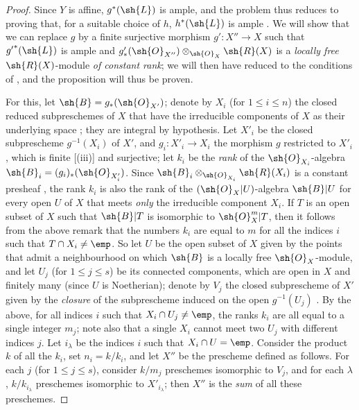 \begin{proof}
Since $Y$ is affine, $g^*(\sh{L})$ is ample, and the problem thus reduces to proving that, for a suitable choice of $h$, $h^*(\sh{L})$ is ample .
We will show that we can replace $g$ by a finite surjective morphism $g':X''\to X$ such that ${g'}^*(\sh{L})$ is ample and $g'_*(\sh{O}_{X''})\otimes_{\sh{O}_X}\sh{R}(X)$ is a \emph{locally free} $\sh{R}(X)$-module \emph{of constant rank};
we will then have reduced to the conditions of , and the proposition will thus be proven.

For this, let $\sh{B}=g_*(\sh{O}_{X'})$;
denote by $X_i$ (for $1\leq i\leq n$) the closed reduced subpreschemes of $X$ that have the irreducible components of $X$ as their underlying space ;
they are integral by hypothesis.
Let $X'_i$ be the closed subprescheme $g^{-1}(X_i)$ of $X'$, and $g_i:X'_i\to X_i$ the morphism $g$ restricted to $X'_i$, which is finite [(iii)] and surjective;
let $k_i$ be the \emph{rank} of the $\sh{O}_{X_i}$-algebra $\sh{B}_i=(g_i)_*(\sh{O}_{X'_i})$.
Since $\sh{B}_i\otimes_{\sh{O}_{X_i}}\sh{R}(X_i)$ is a constant presheaf , the rank $k_i$ is also the rank of the $(\sh{O}_X|U)$-algebra $\sh{B}|U$ for every open $U$ of $X$ that meets \emph{only} the irreducible component $X_i$.
If $T$ is an open subset of $X$ such that $\sh{B}|T$ is isomorphic to $\sh{O}_X^m|T$, then it follows from the above remark that the numbers $k_i$ are equal to $m$ for all the indices $i$ such that $T\cap X_i\neq\emp$.
So let $U$ be the open subset of $X$ given by the points that admit a neighbourhood on which $\sh{B}$ is a locally free $\sh{O}_X$-module, and let $U_j$ (for $1\leq j\leq s$) be its connected components, which are open in $X$ and finitely many (since $U$ is Noetherian);
denote by $V_j$ the closed subprescheme of $X'$ given by the \emph{closure} of the subprescheme induced on the open $g^{-1}(U_j)$ .
By the above, for all indices $i$ such that $X_i\cap U_j\neq\emp$, the ranks $k_i$ are all equal to a single integer $m_j$;
note also that a single $X_i$ cannot meet two $U_j$ with different indices $j$.
Let $i_\lambda$ be the indices $i$ such that $X_i\cap U=\emp$.
Consider the product $k$ of all the $k_i$, set $n_i=k/k_i$, and let $X''$ be the prescheme defined as follows.
For each $j$ (for $1\leq j\leq s$), consider $k/m_j$ preschemes isomorphic to $V_j$, and for each $\lambda$, $k/k_{i_\lambda}$ preschemes isomorphic to $X'_{i_\lambda}$;
then $X''$ is the \emph{sum} of all these preschemes.

\end{proof}
